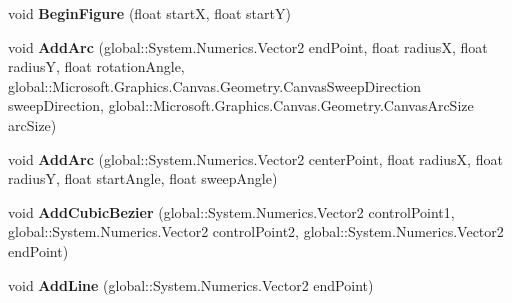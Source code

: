\begin{DoxyCompactItemize}
\item 
\mbox{\label{interface_microsoft_1_1_graphics_1_1_canvas_1_1_geometry_1_1_i_canvas_path_builder_acbe72d48edf4e1066adf59e9f7057323}} 
void {\bfseries Begin\+Figure} (float startX, float startY)
\item 
\mbox{\label{interface_microsoft_1_1_graphics_1_1_canvas_1_1_geometry_1_1_i_canvas_path_builder_aeb2d7c2ee7825de333cf7adbdc0901c8}} 
void {\bfseries Add\+Arc} (global\+::\+System.\+Numerics.\+Vector2 end\+Point, float radiusX, float radiusY, float rotation\+Angle, global\+::\+Microsoft.\+Graphics.\+Canvas.\+Geometry.\+Canvas\+Sweep\+Direction sweep\+Direction, global\+::\+Microsoft.\+Graphics.\+Canvas.\+Geometry.\+Canvas\+Arc\+Size arc\+Size)
\item 
\mbox{\label{interface_microsoft_1_1_graphics_1_1_canvas_1_1_geometry_1_1_i_canvas_path_builder_a176681b2cfb8be5b87fb7ff6c54d6d1c}} 
void {\bfseries Add\+Arc} (global\+::\+System.\+Numerics.\+Vector2 center\+Point, float radiusX, float radiusY, float start\+Angle, float sweep\+Angle)
\item 
\mbox{\label{interface_microsoft_1_1_graphics_1_1_canvas_1_1_geometry_1_1_i_canvas_path_builder_a0f6e31b27417edcdf586fecf8619b879}} 
void {\bfseries Add\+Cubic\+Bezier} (global\+::\+System.\+Numerics.\+Vector2 control\+Point1, global\+::\+System.\+Numerics.\+Vector2 control\+Point2, global\+::\+System.\+Numerics.\+Vector2 end\+Point)
\item 
\mbox{\label{interface_microsoft_1_1_graphics_1_1_canvas_1_1_geometry_1_1_i_canvas_path_builder_aec02c6cfb6989a2cbee2696238ec24fd}} 
void {\bfseries Add\+Line} (global\+::\+System.\+Numerics.\+Vector2 end\+Point)
\item 
\mbox{\label{interface_microsoft_1_1_graphics_1_1_canvas_1_1_geometry_1_1_i_canvas_path_builder_a2758a748e2439c467f7522f7a9b134b8}} 

\end{DoxyCompactItemize}
